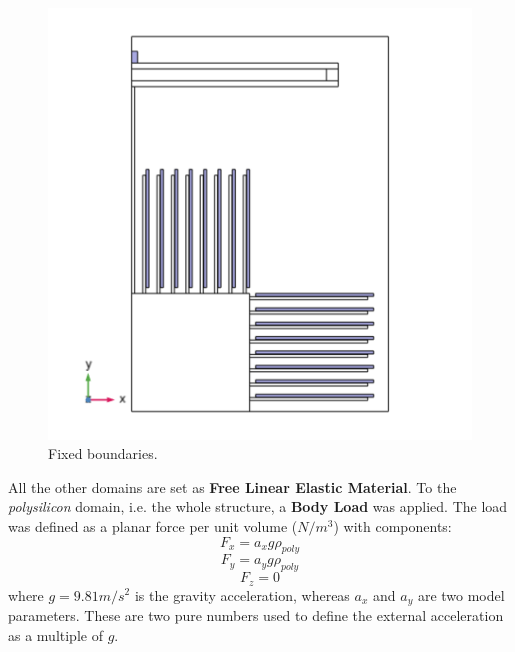 \documentclass[lettersize,journal]{IEEEtran}
\begin{document}
        \begin{figure}[!h]
            \centering
            \includegraphics[width=1.0\linewidth]{fixed_boundaries.png}
            \caption{Fixed boundaries.}
            \label{fig:fixed-bound}
        \end{figure}
        
        All the other domains are set as \textbf{Free Linear Elastic Material}. To the \textit{polysilicon} domain, i.e. the whole structure, a \textbf{Body Load} was applied. The load was defined as a planar force per unit volume (\(N/m^3\)) with components:
        \begin{equation*}
            F_x=a_x g \rho_{poly}
        \end{equation*}
        \begin{equation*}
            F_y=a_y g \rho_{poly}
        \end{equation*}
        \begin{equation*}
            F_z=0
        \end{equation*}
        where \(g=9.81m/s^2\) is the gravity acceleration, whereas \(a_x\) and \(a_y\) are two model parameters. These are two pure numbers used to define the external acceleration as a multiple of \(g\).
        
        
        \iffalse
        \bigskip
\end{document}
